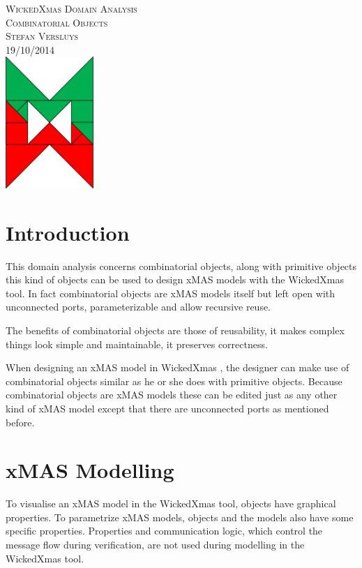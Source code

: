 \documentclass[a4paper,11pt,final]{article}
\begin{document}
\begin{titlepage}
	\vspace*{\fill}
	\begin{center}
		\textsc{\large WickedXmas Domain Analysis}\\[0.5cm]
		\textsc{\huge Combinatorial Objects}\\[0.5cm]
		\textsc{Stefan Versluys}\\ \textsc{\scriptsize 19/10/2014}\\[2.0cm]
		\includegraphics[width=0.25\textwidth]{wXm}
	\end{center}
	\vspace*{\fill}
\end{titlepage}


\tableofcontents

\newpage

\section{Introduction}
This domain analysis concerns combinatorial objects,
along with primitive objects this kind of objects can be used to design xMAS
models with the WickedXmas tool. In fact combinatorial objects are xMAS models
itself but left open with unconnected ports, parameterizable and allow recursive reuse.

The benefits of combinatorial objects are those of reusability, it makes complex things look simple and maintainable, it preserves correctness.

When designing an xMAS model in WickedXmas , the designer can make use of combinatorial objects similar as he or she does with primitive objects. Because
combinatorial objects are xMAS models these can be edited just as any other kind of xMAS model except that there are unconnected ports as mentioned before.


\section{xMAS Modelling}
To visualise an xMAS model in the WickedXmas tool,
objects have graphical properties. To parametrize xMAS models, objects and the
models also have some specific properties. Properties and communication logic,
which control the message flow during verification, are not used during
modelling in the WickedXmas tool. 
\end{document}
